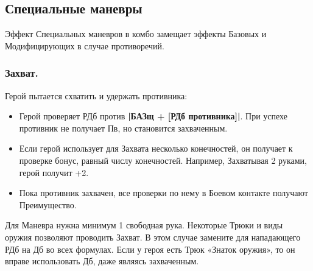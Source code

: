 \subsection{Специальные маневры}
Эффект Специальных маневров в комбо замещает эффекты Базовых и Модифицирующих в случае противоречий.

\subsubsection{Захват.}
Герой пытается схватить и удержать противника:
\begin{itemize}
  \item Герой проверяет РДб против \textbf{|БАЗщ + [РДб противника]|}. При успехе противник не получает Пв, но становится захваченным.
  \item Если герой использует для Захвата несколько конечностей, он получает к проверке бонус, равный числу конечностей. Например, Захватывая 2 руками, герой получит +2.
  \item Пока противник захвачен, все проверки по нему в Боевом контакте получают Преимущество.
\end{itemize}
Для Маневра нужна минимум 1 свободная рука. Некоторые Трюки и виды оружия позволяют проводить Захват. В этом случае замените для нападающего РДб на Дб во всех формулах.
\newline Если у героя есть Трюк «Знаток оружия», то он вправе использовать Дб, даже являясь захваченным.


